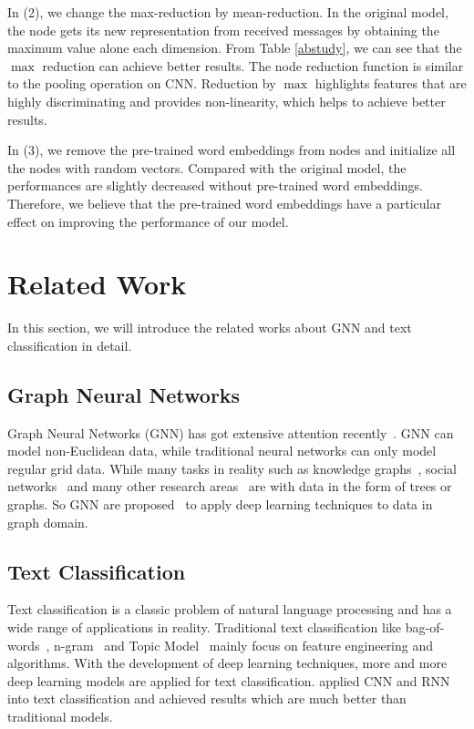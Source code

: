 \documentclass[11pt,a4paper]{article}
\begin{document}
In (2), we change the max-reduction by mean-reduction. In the original model, the node gets its new representation from received messages by obtaining the maximum value alone each dimension. From Table \ref{abstudy}, we can see that the $\max$ reduction can achieve better results. The node reduction function is similar to the pooling operation on CNN. Reduction by $\max$ highlights features that are highly discriminating and provides non-linearity, which helps to achieve better results.

In (3), we remove the pre-trained word embeddings from nodes and initialize all the nodes with random vectors. Compared with the original model, the performances are slightly decreased without pre-trained word embeddings. Therefore, we believe that the pre-trained word embeddings have a particular effect on improving the performance of our model.





\section{Related Work}
In this section, we will introduce the related works about GNN and text classification in detail. 
\subsection{Graph Neural Networks}
Graph Neural Networks (GNN) has got extensive attention recently~\cite{zhou2018graph, zhang2018deep, wu2019comprehensive}. GNN can model non-Euclidean data, while traditional neural networks can only model regular grid data. While many tasks in reality such as knowledge graphs~\cite{hamaguchi2017knowledge}, social networks~\cite{hamilton2017inductive} and many other research areas~\cite{khalil2017learning} are with data in the form of trees or graphs. So GNN are proposed~\cite{scarselli2009graph} to apply deep learning techniques to data in graph domain. 

\subsection{Text Classification}
Text classification is a classic problem of natural language processing and has a wide range of applications in reality. Traditional text classification like bag-of-words~\cite{zhang2010understanding}, n-gram~\cite{wang2012baselines} and Topic Model~\cite{wallach2006topic} mainly focus on feature engineering and algorithms. With the development of deep learning techniques, more and more deep learning models are applied for text classification.  applied CNN and RNN into text classification and achieved results which are much better than traditional models. 
\end{document}

